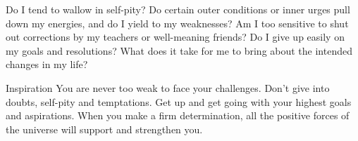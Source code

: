 \newpage
\begin{mananam}{}
\mananamtext Do I tend to wallow in self-pity? Do certain outer conditions or inner urges pull down my energies, and do I yield to my weaknesses? Am I too sensitive to shut out corrections by my teachers or well-meaning friends?
Do I give up easily on my goals and resolutions? What does it take for me to bring about the intended changes in my life?
\end{mananam}
\WritingHand{}
\begin{inspiration}{\mananamfont Inspiration}
\mananamtext You are never too weak to face your challenges. Don’t give into doubts, self-pity and temptations. Get up and get going with your highest goals and aspirations. When you make a firm determination, all the positive forces of the universe will support and strengthen you.
\end{inspiration}
\newpage


